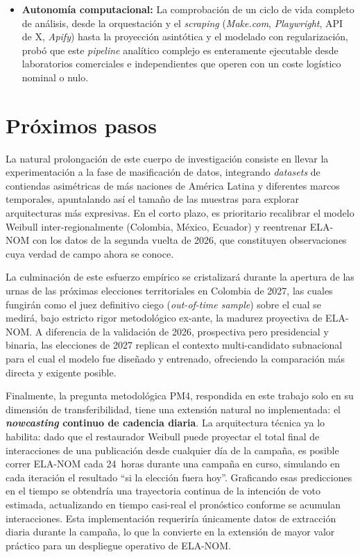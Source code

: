 \begin{itemize}
    \item \textbf{Autonomía computacional:} La comprobación de un ciclo de vida completo de análisis, desde la orquestación y el \textit{scraping} (\textit{Make.com}, \textit{Playwright}, API de X, \textit{Apify}) hasta la proyección asintótica y el modelado con regularización, probó que este \textit{pipeline} analítico complejo es enteramente ejecutable desde laboratorios comerciales e independientes que operen con un coste logístico nominal o nulo.
\end{itemize}

\section{Próximos pasos}

La natural prolongación de este cuerpo de investigación consiste en llevar la experimentación a la fase de masificación de datos, integrando \textit{datasets} de contiendas asimétricas de más naciones de América Latina y diferentes marcos temporales, apuntalando así el tamaño de las muestras para explorar arquitecturas más expresivas. En el corto plazo, es prioritario recalibrar el modelo Weibull inter-regionalmente (Colombia, México, Ecuador) y reentrenar ELA-NOM con los datos de la segunda vuelta de 2026, que constituyen observaciones cuya verdad de campo ahora se conoce.

La culminación de este esfuerzo empírico se cristalizará durante la apertura de las urnas de las próximas elecciones territoriales en Colombia de 2027, las cuales fungirán como el juez definitivo ciego (\textit{out-of-time sample}) sobre el cual se medirá, bajo estricto rigor metodológico ex-ante, la madurez proyectiva de ELA-NOM. A diferencia de la validación de 2026, prospectiva pero presidencial y binaria, las elecciones de 2027 replican el contexto multi-candidato subnacional para el cual el modelo fue diseñado y entrenado, ofreciendo la comparación más directa y exigente posible.

Finalmente, la pregunta metodológica PM4, respondida en este trabajo solo en su dimensión de transferibilidad, tiene una extensión natural no implementada: el \textbf{\textit{nowcasting} continuo de cadencia diaria}. La arquitectura técnica ya lo habilita: dado que el restaurador Weibull puede proyectar el total final de interacciones de una publicación desde cualquier día de la campaña, es posible correr ELA-NOM cada 24~horas durante una campaña en curso, simulando en cada iteración el resultado ``si la elección fuera hoy''. Graficando esas predicciones en el tiempo se obtendría una trayectoria continua de la intención de voto estimada, actualizando en tiempo casi-real el pronóstico conforme se acumulan interacciones. Esta implementación requeriría únicamente datos de extracción diaria durante la campaña, lo que la convierte en la extensión de mayor valor práctico para un despliegue operativo de ELA-NOM.
